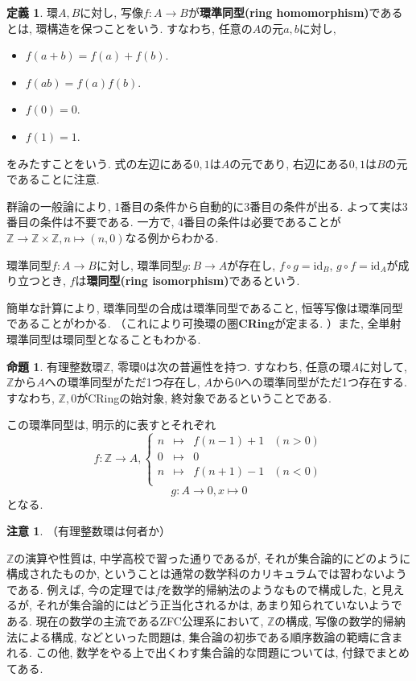 \documentclass[a4paper, twoside]{bxjsarticle}
\newcommand{\zah}{\mathbb{Z}}
\newcommand{\tb}{\textbf}
\theoremstyle{definition}
\newtheorem{prop}[thm]{命題}
\newtheorem{defn}[thm]{定義}
\newtheorem{rem}[thm]{注意}
\begin{document}
        \begin{defn}
            環$A, B$に対し, 写像$f\colon A\to B$が\tb{環準同型(ring homomorphism)}であるとは, 環構造を保つことをいう. すなわち, 任意の$A$の元$a, b$に対し, 
            \begin{itemize}
                \item $f(a+b)=f(a)+f(b)$.
                \item $f(ab)=f(a)f(b)$.
                \item $f(0)=0$.
                \item $f(1)=1$. 
            \end{itemize}
            をみたすことをいう. 式の左辺にある$0, 1$は$A$の元であり, 右辺にある$0, 1$は$B$の元であることに注意.

            群論の一般論により, 1番目の条件から自動的に3番目の条件が出る. よって実は3番目の条件は不要である. 一方で, 4番目の条件は必要であることが$\zah\to\zah\times\zah, n\mapsto (n, 0)$なる例からわかる. 
            
            環準同型$f\colon A\to B$に対し, 環準同型$g\colon B\to A$が存在し, $f\circ g = \text{id}_B$, $g\circ f = \text{id}_A$が成り立つとき, $f$は\tb{環同型(ring isomorphism)}であるという. 

            簡単な計算により, 環準同型の合成は環準同型であること, 恒等写像は環準同型であることがわかる. （これにより可換環の圏\tb{CRing}が定まる. ）また, 全単射環準同型は環同型となることもわかる. 
        \end{defn}
        \begin{prop}
           有理整数環$\zah$, 零環$0$は次の普遍性を持つ. すなわち, 任意の環$A$に対して, $\zah$から$A$への環準同型がただ1つ存在し, $A$から$0$への環準同型がただ1つ存在する. すなわち, $\zah, 0$がCRingの始対象, 終対象であるということである.

            この環準同型は, 明示的に表すとそれぞれ\[f\colon \zah\to A, \left\{\begin{array}{llll} n&\mapsto& f(n-1)+1&(n>0)\\ 0&\mapsto&0& \\ n&\mapsto& f(n+1)-1 & (n<0)\\ \end{array}\right. \]\[g\colon A\to 0, x\mapsto 0\]となる.
        \end{prop}
        \begin{rem}（有理整数環は何者か）
            
            $\zah$の演算や性質は, 中学高校で習った通りであるが, それが集合論的にどのように構成されたものか, ということは通常の数学科のカリキュラムでは習わないようである. 例えば, 今の定理では$f$を数学的帰納法のようなもので構成した, と見えるが, それが集合論的にはどう正当化されるかは, あまり知られていないようである.
            現在の数学の主流であるZFC公理系において, $\zah$の構成, 写像の数学的帰納法による構成, などといった問題は, 集合論の初歩である順序数論の範疇に含まれる. この他, 数学をやる上で出くわす集合論的な問題については, 付録でまとめてある.
        \end{rem}
\end{document}
